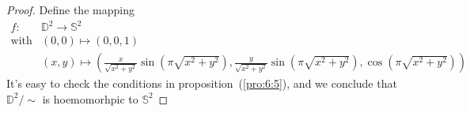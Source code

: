 \begin{enumerate}
\begin{proof}
Define the mapping
\[
\begin{array}{ll}
f:&\mathbb{D}^2\to\mathbb{S}^2\\
\text{with}&(0,0)\mapsto(0,0,1)\\
&(x,y)\mapsto\left(\frac{x}{\sqrt{x^2+y^2}}\sin(\pi\sqrt{x^2+y^2}), \frac{y}{\sqrt{x^2+y^2}}\sin(\pi\sqrt{x^2+y^2}), \cos(\pi\sqrt{x^2+y^2})\right)
\end{array}
\]
It's easy to check the conditions in proposition~(\ref{pro:6:5}), and we conclude that $\mathbb{D}^2/\sim$ is hoemomorhpic to $\mathbb{S}^2$
\end{proof}

\end{enumerate}











